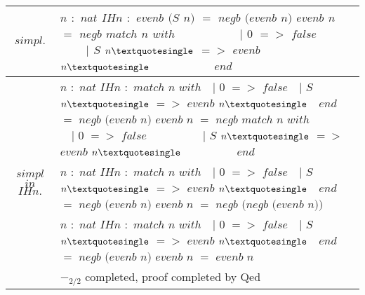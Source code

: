 \begin{longtable}{| S | P |}
	\hline
	 & $n$$ $ $ : $ $ nat$\linebreak
	$IHn$$ $ $ : $ $ evenb $ $ (S $ $ n) $ $ = $ $ negb $ $ (evenb $ $ n)$\linebreak
	\fracrule\linebreak
	$evenb $ $ n $ $ = $ $ negb $ $ match $ $ n $ $ with
	$ $  $ $  $ $  $ $  $ $  $ $  $ $  $ $  $ $  $ $  $ $  $ $  $ $  $ $  $ $ | $ $ 0 $ $ ={>} $ $ false
	$ $  $ $  $ $  $ $  $ $  $ $  $ $  $ $  $ $  $ $  $ $  $ $  $ $  $ $  $ $ | $ $ S $ $ n{\textquotesingle} $ $ ={>} $ $ evenb $ $ n{\textquotesingle}
	$ $  $ $  $ $  $ $  $ $  $ $  $ $  $ $  $ $  $ $  $ $  $ $  $ $  $ $  $ $ end$\\

	\hline
	 & $n$$ $ $ : $ $ nat$\linebreak
	$IHn$$ $ $ : $ $ match $ $ n $ $ with
	$ $  $ $  $ $ | $ $ 0 $ $ ={>} $ $ false
	$ $  $ $  $ $ | $ $ S $ $ n{\textquotesingle} $ $ ={>} $ $ evenb $ $ n{\textquotesingle}
	$ $  $ $  $ $ end $ $ = $ $ negb $ $ (evenb $ $ n)$\linebreak
	\fracrule\linebreak
	$evenb $ $ n $ $ = $ $ negb $ $ match $ $ n $ $ with
	$ $  $ $  $ $  $ $  $ $  $ $  $ $  $ $  $ $  $ $  $ $  $ $  $ $  $ $  $ $ | $ $ 0 $ $ ={>} $ $ false
	$ $  $ $  $ $  $ $  $ $  $ $  $ $  $ $  $ $  $ $  $ $  $ $  $ $  $ $  $ $ | $ $ S $ $ n{\textquotesingle} $ $ ={>} $ $ evenb $ $ n{\textquotesingle}
	$ $  $ $  $ $  $ $  $ $  $ $  $ $  $ $  $ $  $ $  $ $  $ $  $ $  $ $  $ $ end$\\

	\hline
	 & $n$$ $ $ : $ $ nat$\linebreak
	$IHn$$ $ $ : $ $ match $ $ n $ $ with
	$ $  $ $  $ $ | $ $ 0 $ $ ={>} $ $ false
	$ $  $ $  $ $ | $ $ S $ $ n{\textquotesingle} $ $ ={>} $ $ evenb $ $ n{\textquotesingle}
	$ $  $ $  $ $ end $ $ = $ $ negb $ $ (evenb $ $ n)$\linebreak
	\fracrule\linebreak
	$evenb $ $ n $ $ = $ $ negb $ $ (negb $ $ (evenb $ $ n))$\\

	\hline
	 & $n$$ $ $ : $ $ nat$\linebreak
	$IHn$$ $ $ : $ $ match $ $ n $ $ with
	$ $  $ $  $ $ | $ $ 0 $ $ ={>} $ $ false
	$ $  $ $  $ $ | $ $ S $ $ n{\textquotesingle} $ $ ={>} $ $ evenb $ $ n{\textquotesingle}
	$ $  $ $  $ $ end $ $ = $ $ negb $ $ (evenb $ $ n)$\linebreak
	\fracrule\linebreak
	$evenb $ $ n $ $ = $ $ evenb $ $ n$\\

	\hline
	$reflexivity.$ & $-_{2/2}$ completed, proof completed by Qed \label{Proofs:coq-example:Theorem:evenb-S} \\
	\hline
\end{longtable}

